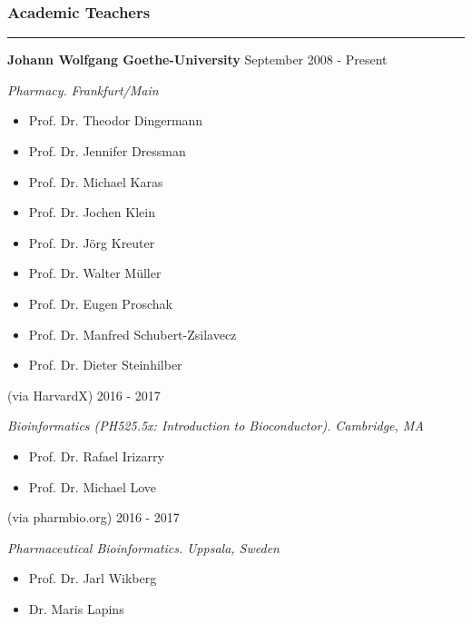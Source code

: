 \subsubsection{\textbf{Academic Teachers}}
\vspace{-8pt}
\hrule
\vspace{10pt}

{\bf Johann Wolfgang Goethe-University} \hfill September 2008 - Present

\emph{Pharmacy.} \hfill \emph{Frankfurt/Main}
\vspace{-10pt}
\begin{itemize}[noitemsep, leftmargin=.5cm, label={\tiny\raisebox{.5ex}{\textbullet}}]
\item Prof. Dr. Theodor Dingermann
\item Prof. Dr. Jennifer Dressman
\item Prof. Dr. Michael Karas
\item Prof. Dr. Jochen Klein
\item Prof. Dr. Jörg Kreuter
\item Prof. Dr. Walter Müller
\item Prof. Dr. Eugen Proschak
\item Prof. Dr. Manfred Schubert-Zsilavecz
\item Prof. Dr. Dieter Steinhilber
\end{itemize}

 (via HarvardX) \hfill 2016 - 2017

\emph{Bioinformatics (PH525.5x: Introduction to Bioconductor).} \hfill \emph{Cambridge, MA}
\vspace{-10pt}
\begin{itemize}[noitemsep, leftmargin=.5cm, label={\tiny\raisebox{.5ex}{\textbullet}}]
\item Prof. Dr. Rafael Irizarry
\item Prof. Dr. Michael Love
\end{itemize}

 (via pharmbio.org) \hfill 2016 - 2017

\emph{Pharmaceutical Bioinformatics.} \hfill \emph{Uppsala, Sweden}
\vspace{-10pt}
\begin{itemize}[noitemsep, leftmargin=.5cm, label={\tiny\raisebox{.5ex}{\textbullet}}]
\item Prof. Dr. Jarl Wikberg
\item Dr. Maris Lapins
\end{itemize}

